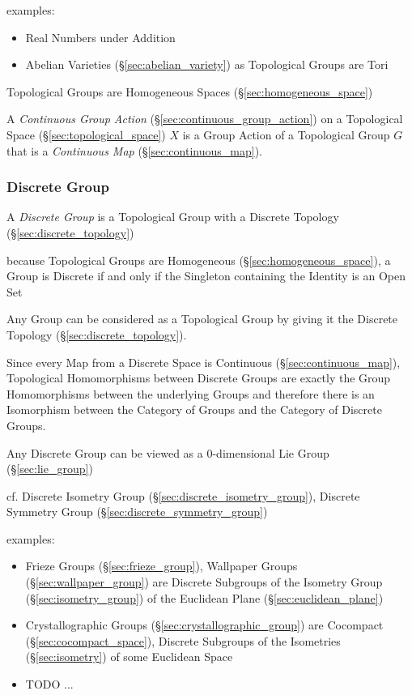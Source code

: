 examples:
\begin{itemize}
  \item Real Numbers under Addition
  \item Abelian Varieties (\S\ref{sec:abelian_variety}) as Topological Groups
    are Tori %
\end{itemize}

Topological Groups are Homogeneous Spaces (\S\ref{sec:homogeneous_space})

A \emph{Continuous Group Action} (\S\ref{sec:continuous_group_action}) on a
Topological Space (\S\ref{sec:topological_space}) $X$ is a Group Action of a
Topological Group $G$ that is a \emph{Continuous Map}
(\S\ref{sec:continuous_map}).



\subsubsection{Discrete Group}\label{sec:discrete_group}

A \emph{Discrete Group} is a Topological Group with a Discrete Topology
(\S\ref{sec:discrete_topology})

because Topological Groups are Homogeneous (\S\ref{sec:homogeneous_space}), a
Group is Discrete if and only if the Singleton containing the Identity is an
Open Set

Any Group can be considered as a Topological Group by giving it the Discrete
Topology (\S\ref{sec:discrete_topology}).

Since every Map from a Discrete Space is Continuous
(\S\ref{sec:continuous_map}), Topological Homomorphisms between Discrete Groups
are exactly the Group Homomorphisms between the underlying Groups and therefore
there is an Isomorphism between the Category of Groups and the Category of
Discrete Groups.

Any Discrete Group can be viewed as a $0$-dimensional Lie Group
(\S\ref{sec:lie_group}) %

cf. Discrete Isometry Group (\S\ref{sec:discrete_isometry_group}), Discrete
Symmetry Group (\S\ref{sec:discrete_symmetry_group})

examples:
\begin{itemize}
  \item Frieze Groups (\S\ref{sec:frieze_group}), Wallpaper Groups
    (\S\ref{sec:wallpaper_group}) are Discrete Subgroups of the Isometry Group
    (\S\ref{sec:isometry_group}) of the Euclidean Plane
    (\S\ref{sec:euclidean_plane})
  \item Crystallographic Groups (\S\ref{sec:crystallographic_group}) are
    Cocompact (\S\ref{sec:cocompact_space}), Discrete Subgroups of the
    Isometries (\S\ref{sec:isometry}) of some Euclidean Space
  \item TODO
  ...
\end{itemize}



